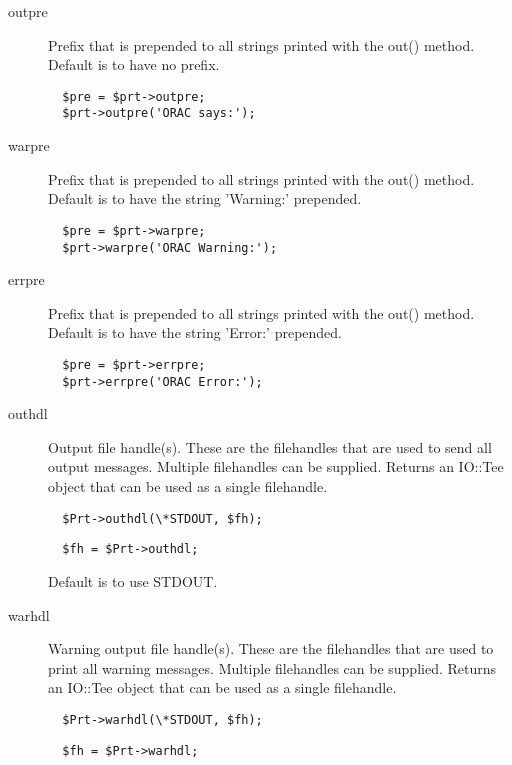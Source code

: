 \begin{description}
\item[outpre] \mbox{}

Prefix that is prepended to all strings printed with the
out() method. Default is to have no prefix.

\begin{verbatim}
  $pre = $prt->outpre;
  $prt->outpre('ORAC says:');
\end{verbatim}

\item[warpre] \mbox{}

Prefix that is prepended to all strings printed with the
out() method. Default is to have the string 'Warning:' prepended.

\begin{verbatim}
  $pre = $prt->warpre;
  $prt->warpre('ORAC Warning:');
\end{verbatim}

\item[errpre] \mbox{}

Prefix that is prepended to all strings printed with the
out() method. Default is to have the string 'Error:' prepended.

\begin{verbatim}
  $pre = $prt->errpre;
  $prt->errpre('ORAC Error:');
\end{verbatim}

\item[outhdl] \mbox{}

Output file handle(s). These are the filehandles that are used
to send all output messages. Multiple filehandles can be supplied.
Returns an IO::Tee object that can be used as a single filehandle.

\begin{verbatim}
  $Prt->outhdl(\*STDOUT, $fh);
\end{verbatim}
\begin{verbatim}
  $fh = $Prt->outhdl;
\end{verbatim}


Default is to use STDOUT.


\item[warhdl] \mbox{}

Warning output file handle(s). These are the filehandles that are used
to print all warning messages. Multiple filehandles can be supplied.
Returns an IO::Tee object that can be used as a single filehandle.

\begin{verbatim}
  $Prt->warhdl(\*STDOUT, $fh);
\end{verbatim}
\begin{verbatim}
  $fh = $Prt->warhdl;
\end{verbatim}



\end{description}
